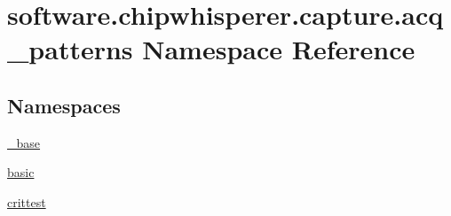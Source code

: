 \hypertarget{namespacesoftware_1_1chipwhisperer_1_1capture_1_1acq__patterns}{}\section{software.\+chipwhisperer.\+capture.\+acq\+\_\+patterns Namespace Reference}
\label{namespacesoftware_1_1chipwhisperer_1_1capture_1_1acq__patterns}
\subsection*{Namespaces}
\begin{DoxyCompactItemize}
\item 
 \hyperlink{namespacesoftware_1_1chipwhisperer_1_1capture_1_1acq__patterns_1_1__base}{\+\_\+base}
\item 
 \hyperlink{namespacesoftware_1_1chipwhisperer_1_1capture_1_1acq__patterns_1_1basic}{basic}
\item 
 \hyperlink{namespacesoftware_1_1chipwhisperer_1_1capture_1_1acq__patterns_1_1crittest}{crittest}
\end{DoxyCompactItemize}
